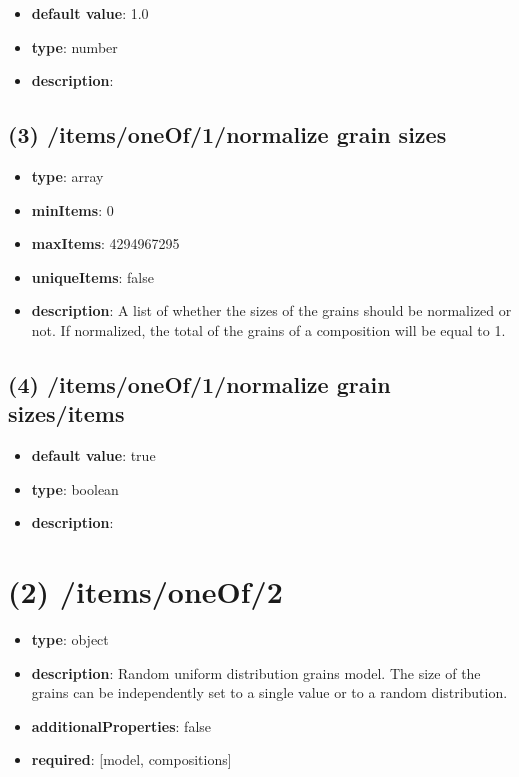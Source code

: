 \begin{itemize}[leftmargin=4em]\item {\bf default value}: 1.0
\item {\bf type}: number
\item {\bf description}: 
\end{itemize}\subsection{(3) /items/oneOf/1/normalize grain sizes}
\begin{itemize}[leftmargin=3em]\item {\bf type}: array
\item {\bf minItems}: 0
\item {\bf maxItems}: 4294967295
\item {\bf uniqueItems}: false
\item {\bf description}: A list of whether the sizes of the grains should be normalized or not. If normalized, the total of the grains of a composition will be equal to 1.
\end{itemize}\subsection{(4) /items/oneOf/1/normalize grain sizes/items}
\begin{itemize}[leftmargin=4em]\item {\bf default value}: true
\item {\bf type}: boolean
\item {\bf description}: 
\end{itemize}\section{(2) /items/oneOf/2}
\begin{itemize}[leftmargin=2em]\item {\bf type}: object
\item {\bf description}: Random uniform distribution grains model. The size of the grains can be independently set to a single value or to a random distribution.
\item {\bf additionalProperties}: false
\item {\bf required}: [model, compositions]\end{itemize}
